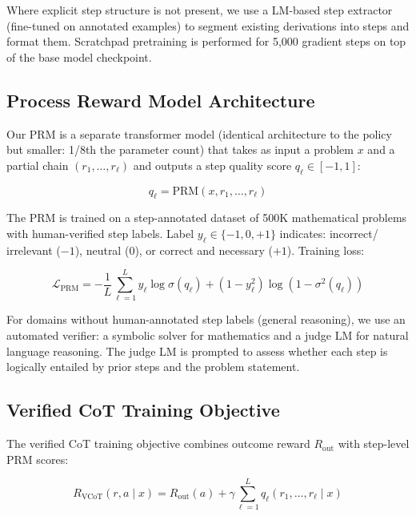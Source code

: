 \documentclass[11pt,a4paper]{article}
\begin{document}
Where explicit step structure is not present, we use a LM-based step extractor (fine-tuned
on annotated examples) to segment existing derivations into steps and format them.
Scratchpad pretraining is performed for 5,000 gradient steps on top of the base model
checkpoint.

\subsection{Process Reward Model Architecture}

Our PRM is a separate transformer model (identical architecture to the policy but
smaller: 1/8th the parameter count) that takes as input a problem $x$ and a partial
chain $(r_1, \ldots, r_\ell)$ and outputs a step quality score $q_\ell \in [-1, 1]$:

\begin{equation}
    q_\ell = \text{PRM}(x, r_1, \ldots, r_\ell)
    \label{eq:prm}
\end{equation}

The PRM is trained on a step-annotated dataset of 500K mathematical problems with
human-verified step labels. Label $y_\ell \in \{-1, 0, +1\}$ indicates: incorrect/
irrelevant ($-1$), neutral ($0$), or correct and necessary ($+1$). Training loss:

\begin{equation}
    \mathcal{L}_{\text{PRM}} = -\frac{1}{L}\sum_{\ell=1}^{L}
    y_\ell \log \sigma(q_\ell)
    + (1-y_\ell^2) \log(1 - \sigma^2(q_\ell))
    \label{eq:prm_loss}
\end{equation}

For domains without human-annotated step labels (general reasoning), we use an
automated verifier: a symbolic solver for mathematics and a judge LM for natural
language reasoning. The judge LM is prompted to assess whether each step is logically
entailed by prior steps and the problem statement.

\subsection{Verified CoT Training Objective}

The verified CoT training objective combines outcome reward $R_{\text{out}}$ with
step-level PRM scores:

\begin{equation}
    R_{\text{VCoT}}(r, a \mid x) = R_{\text{out}}(a) +
    \gamma \sum_{\ell=1}^{L} q_\ell(r_1, \ldots, r_\ell \mid x)
    \label{eq:vcot_reward}
\end{equation}
\end{document}
